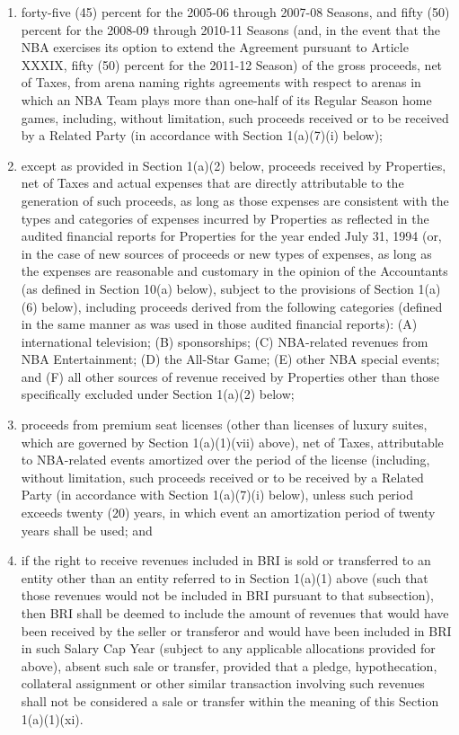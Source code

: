 \documentclass[
]{book}
\begin{document}
\begin{enumerate}
\begin{enumerate}
\begin{enumerate}
    \item
      forty-five (45) percent for the 2005-06 through 2007-08 Seasons, and fifty (50) percent for the 2008-09 through 2010-11 Seasons (and, in the event that the NBA exercises its option to extend the Agreement pursuant to Article XXXIX, fifty (50) percent for the 2011-12 Season) of the gross proceeds, net of Taxes, from arena naming rights agreements with respect to arenas in which an NBA Team plays more than one-half of its Regular Season home games, including, without limitation, such proceeds received or to be received by a Related Party (in accordance with Section 1(a)(7)(i) below);
    \item
      except as provided in Section 1(a)(2) below, proceeds received by Properties, net of Taxes and actual expenses that are directly attributable to the generation of such proceeds, as long as those expenses are consistent with the types and categories of expenses incurred by Properties as reflected in the audited financial reports for Properties for the year ended July 31, 1994 (or, in the case of new sources of proceeds or new types of expenses, as long as the expenses are reasonable and customary in the opinion of the Accountants (as defined in Section 10(a) below), subject to the provisions of Section 1(a)(6) below), including proceeds derived from the following categories (defined in the same manner as was used in those audited financial reports): (A) international television; (B) sponsorships; (C) NBA-related revenues from NBA Entertainment; (D) the All-Star Game; (E) other NBA special events; and (F) all other sources of revenue received by Properties other than those specifically excluded under Section 1(a)(2) below;
    \item
      proceeds from premium seat licenses (other than licenses of luxury suites, which are governed by Section 1(a)(1)(vii) above), net of Taxes, attributable to NBA-related events amortized over the period of the license (including, without limitation, such proceeds received or to be received by a Related Party (in accordance with Section 1(a)(7)(i) below), unless such period exceeds twenty (20) years, in which event an amortization period of twenty years shall be used; and
    \item
      if the right to receive revenues included in BRI is sold or transferred to an entity other than an entity referred to in Section 1(a)(1) above (such that those revenues would not be included in BRI pursuant to that subsection), then BRI shall be deemed to include the amount of revenues that would have been received by the seller or transferor and would have been included in BRI in such Salary Cap Year (subject to any applicable allocations provided for above), absent such sale or transfer, provided that a pledge, hypothecation, collateral assignment or other similar transaction involving such revenues shall not be considered a sale or transfer within the meaning of this Section 1(a)(1)(xi).

\end{enumerate}
\end{enumerate}
\end{enumerate}
\end{document}
